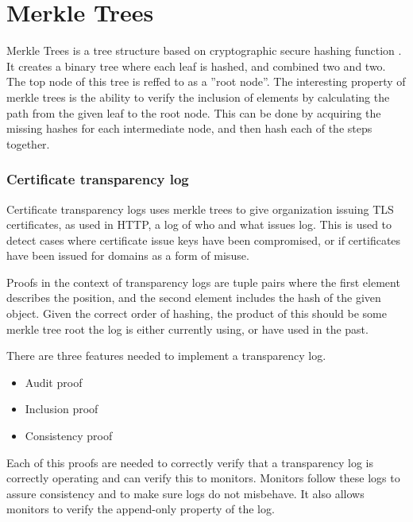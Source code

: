 \documentclass[../Main/thesis.tex]{subfiles}
\begin{document}

\section{Merkle Trees}
Merkle Trees is a tree structure based on cryptographic secure hashing function
\cite{ralph-c.-merkle-1998}. It creates a binary tree where each leaf is hashed,
and combined two and two. The top node of this tree is reffed to as a ''root
node''. The interesting property of merkle trees is the ability to verify the
inclusion of elements by calculating the path from the given leaf to the root
node. This can be done by acquiring the missing hashes for each intermediate
node, and then hash each of the steps together.


\subsubsection*{Certificate transparency log}
Certificate transparency logs uses merkle trees to give organization issuing
TLS certificates, as used in HTTP, a log of who and what issues
log.\cite{b.-laurie-a.-langley-e.kaster-google-2013} This is used to detect
cases where certificate issue keys have been compromised, or if certificates
have been issued for domains as a form of misuse.

Proofs in the context of transparency logs are tuple pairs where the first
element describes the position, and the second element includes the hash of
the given object. Given the correct order of hashing, the product of this
should be some merkle tree root the log is either currently using, or have
used in the past.

There are three features needed to implement a transparency log.

\begin{itemize}
\item Audit proof
\item Inclusion proof
\item Consistency proof
\end{itemize}

Each of this proofs are needed to correctly verify that a transparency log
is correctly operating and can verify this to monitors.  Monitors follow
these logs to assure consistency and to make sure logs do not misbehave. It
also allows monitors to verify the append-only property of the log.
\end{document}
